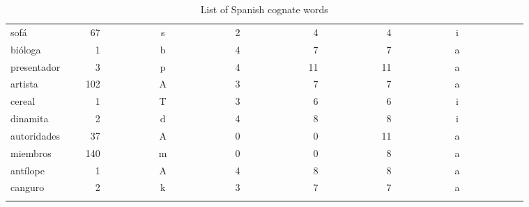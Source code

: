 \begin{longtable}{|l|c|c|c|c|c|c|}
sof\'{a}~~~~~~~~~&~67~~~~~~~~~~&s~~~~~~~~~~~~&2~~~~~~~~~~~~&~4~~~~~~~~~~~&~4~~~~~~~~~~~&i~~~~~~~~~~~~\\ 
bi\'{o}loga~~~~~~&~~1~~~~~~~~~~&b~~~~~~~~~~~~&4~~~~~~~~~~~~&~7~~~~~~~~~~~&~7~~~~~~~~~~~&a~~~~~~~~~~~~\\ 
presentador~~&~~3~~~~~~~~~~&p~~~~~~~~~~~~&4~~~~~~~~~~~~&11~~~~~~~~~~~&11~~~~~~~~~~~&a~~~~~~~~~~~~\\ 
artista~~~~~~&102~~~~~~~~~~&A~~~~~~~~~~~~&3~~~~~~~~~~~~&~7~~~~~~~~~~~&~7~~~~~~~~~~~&a~~~~~~~~~~~~\\ 
cereal~~~~~~~&~~1~~~~~~~~~~&T~~~~~~~~~~~~&3~~~~~~~~~~~~&~6~~~~~~~~~~~&~6~~~~~~~~~~~&i~~~~~~~~~~~~\\ 
dinamita~~~~~&~~2~~~~~~~~~~&d~~~~~~~~~~~~&4~~~~~~~~~~~~&~8~~~~~~~~~~~&~8~~~~~~~~~~~&i~~~~~~~~~~~~\\ 
autoridades~~&~37~~~~~~~~~~&A~~~~~~~~~~~~&0~~~~~~~~~~~~&~0~~~~~~~~~~~&11~~~~~~~~~~~&a~~~~~~~~~~~~\\ 
miembros~~~~~&140~~~~~~~~~~&m~~~~~~~~~~~~&0~~~~~~~~~~~~&~0~~~~~~~~~~~&~8~~~~~~~~~~~&a~~~~~~~~~~~~\\ 
ant\'{i}lope~~~~~&~~1~~~~~~~~~~&A~~~~~~~~~~~~&4~~~~~~~~~~~~&~8~~~~~~~~~~~&~8~~~~~~~~~~~&a~~~~~~~~~~~~\\ 
canguro~~~~~~&~~2~~~~~~~~~~&k~~~~~~~~~~~~&3~~~~~~~~~~~~&~7~~~~~~~~~~~&~7~~~~~~~~~~~&a~~~~~~~~~~~~\\ 
\hline
\caption{List of Spanish cognate  words}\label{span_cognates}
\end{longtable}
